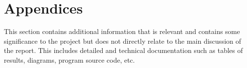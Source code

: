 \section*{Appendices}

This section contains additional information that is relevant and contains some significance to the project but does not directly relate to the main discussion of the report. This includes detailed and technical documentation such as tables of results, diagrams, program source code, etc.

